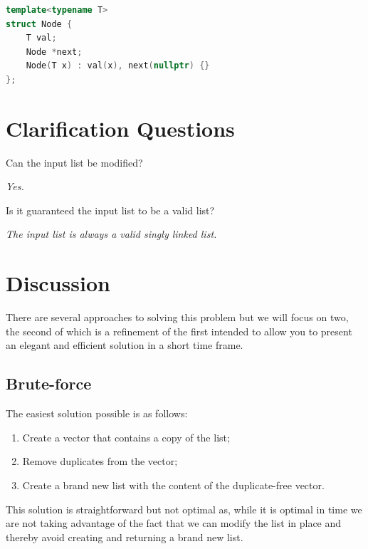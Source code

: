 \begin{lstlisting}[language=c++, caption=Singly Linked list definition,label=list:delete_duplicates_list:linked_list]
template<typename T>
struct Node {
	T val;
	Node *next;
	Node(T x) : val(x), next(nullptr) {}
};
\end{lstlisting}

\section{Clarification Questions}

\begin{QandA}
	\begin{questionitem} \begin{question} Can the input list be modified?  \end{question} 	 
    \begin{answered}
		\textit{Yes.}
	\end{answered} \end{questionitem}

	\begin{questionitem} \begin{question} Is it guaranteed the input list to be a valid list?  \end{question} 	 
		\begin{answered}
			\textit{The input list is always a valid singly linked list.}
		\end{answered} \end{questionitem}
	
\end{QandA}

\section{Discussion}
\label{delete_duplicates_list:sec:discussion}
There are several approaches to solving this problem but we will focus on two, the second of which is a refinement of the first intended to allow you to present an elegant and efficient solution in a short time frame.

\subsection{Brute-force}
\label{delete_duplicates_list:sec:bruteforce}
The easiest solution possible is as follows:
\begin{enumerate}
	\item Create a vector that contains a copy of the list;
	\item Remove duplicates from the vector;
	\item Create a brand new list with the content of the duplicate-free vector.
\end{enumerate}
This solution is straightforward but not optimal as, while it is optimal in time we are not taking advantage of the fact that we can modify the list in place and thereby avoid creating and returning a brand new list.  

